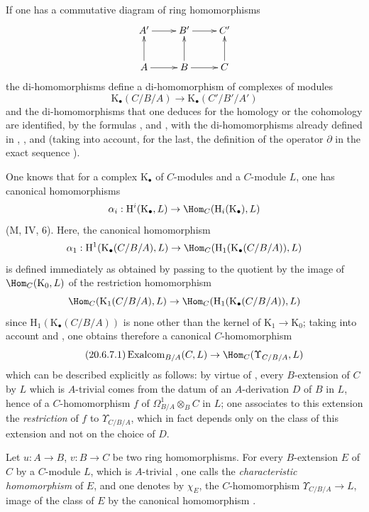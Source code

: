 If one has a commutative diagram of ring homomorphisms
\[
\xymatrix{
  A' \ar[r] & B' \ar[r] & C' \\
  A \ar[u] \ar[r] & B \ar[u] \ar[r] & C \ar[u]
}
\]
the di-homomorphisms  define a di-homomorphism of complexes of modules
\begin{equation}
\tag{20.6.6.4}
  \label{0.20.6.6.4}
  \mathrm{K}_\bullet(C/B/A)\to\mathrm{K}_\bullet(C'/B'/A')
\end{equation}
and the di-homomorphisms that one deduces for the homology or the cohomology are identified, by the formulas ,  and , with the di-homomorphisms already defined in , ,  and  (taking into account, for the last, the definition of the operator $\partial$ in the exact sequence ).

\begin{env}[20.6.7]
\label{0.20.6.7}
One knows that for a complex $\mathrm{K}_\bullet$ of $C$-modules and a $C$-module $L$, one has canonical homomorphisms
\[
  \alpha_i:\mathrm{H}^i(\mathrm{K}_\bullet,L)\to\Hom_C(\mathrm{H}_i(\mathrm{K}_\bullet),L)
\]
(M, IV, 6).
Here, the canonical homomorphism
\[
  \alpha_1:\mathrm{H}^1(\mathrm{K}_\bullet(C/B/A),L)\to\Hom_C(\mathrm{H}_1(\mathrm{K}_\bullet(C/B/A)),L)
\]
is defined immediately as obtained by passing to the quotient by the image of $\Hom_C(\mathrm{K}_0,L)$ of the restriction homomorphism
\[
  \Hom_C(\mathrm{K}_1(C/B/A),L)\to\Hom_C(\mathrm{H}_1(\mathrm{K}_\bullet(C/B/A)),L)
\]
since $\mathrm{H}_1(\mathrm{K}_\bullet(C/B/A))$ is none other than the kernel of $\mathrm{K}_1\to\mathrm{K}_0$; taking into account  and , one obtains therefore a canonical $C$-homomorphism
\begin{equation}
\tag{20.6.7.1}
  \label{0.20.6.7.1}
  \operatorname{Exalcom}_{B/A}(C,L)\to\Hom_C(\Upsilon_{C/B/A},L)
\end{equation}
which can be described explicitly as follows: by virtue of , every $B$-extension of $C$ by $L$ which is $A$-trivial comes from the datum of an $A$-derivation $D$ of $B$ in $L$, hence  of a $C$-homomorphism $f$ of $\Omega^1_{B/A}\otimes_B C$ in $L$; one associates to this extension the \emph{restriction} of $f$ to $\Upsilon_{C/B/A}$, which in fact depends only on the class of this extension and not on the choice of $D$.
\end{env}

\begin{definition}[20.6.8]
\label{0.20.6.8}
Let $u:A\to B$, $v:B\to C$ be two ring homomorphisms.
For every $B$-extension $E$ of $C$ by a $C$-module $L$, which is $A$-trivial , one calls the \emph{characteristic homomorphism} of $E$, and one denotes by $\chi_E$, the $C$-homomorphism $\Upsilon_{C/B/A}\to L$, image of the class of $E$ by the canonical homomorphism .
\end{definition}

